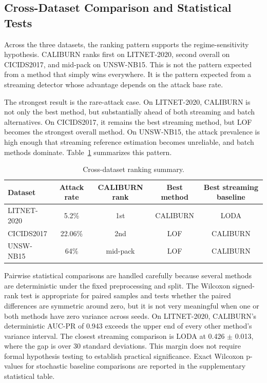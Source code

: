 \documentclass[preprint,12pt,authoryear]{elsarticle}
\newcommand{\caliburn}{CALIBURN}
\begin{document}
\subsection{Cross-Dataset Comparison and Statistical Tests}
\label{sec:results-cross}

Across the three datasets, the ranking pattern supports the regime-sensitivity hypothesis. \caliburn{} ranks first on LITNET-2020, second overall on CICIDS2017, and mid-pack on UNSW-NB15. This is not the pattern expected from a method that simply wins everywhere. It is the pattern expected from a streaming detector whose advantage depends on the attack base rate.

The strongest result is the rare-attack case. On LITNET-2020, \caliburn{} is not only the best method, but substantially ahead of both streaming and batch alternatives. On CICIDS2017, it remains the best streaming method, but LOF becomes the strongest overall method. On UNSW-NB15, the attack prevalence is high enough that streaming reference estimation becomes unreliable, and batch methods dominate. Table~\ref{tab:cross-summary} summarizes this pattern.

\begin{table}[ht]
\centering
\caption{Cross-dataset ranking summary.}
\label{tab:cross-summary}
\begin{tabular}{lcccc}
\toprule
Dataset       & Attack rate & \caliburn{} rank & Best method & Best streaming baseline \\
\midrule
LITNET-2020   & 5.2\%       & 1st              & \caliburn{} & LODA \\
CICIDS2017    & 22.06\%     & 2nd              & LOF         & \caliburn{} \\
UNSW-NB15     & 64\%        & mid-pack         & LOF         & \caliburn{} \\
\bottomrule
\end{tabular}
\end{table}

Pairwise statistical comparisons are handled carefully because several methods are deterministic under the fixed preprocessing and split. The Wilcoxon signed-rank test \citep{wilcoxon1945individual} is appropriate for paired samples and tests whether the paired differences are symmetric around zero, but it is not very meaningful when one or both methods have zero variance across seeds. On LITNET-2020, \caliburn{}'s deterministic AUC-PR of 0.943 exceeds the upper end of every other method's variance interval. The closest streaming comparison is LODA at 0.426 $\pm$ 0.013, where the gap is over 30 standard deviations. This margin does not require formal hypothesis testing to establish practical significance. Exact Wilcoxon p-values for stochastic baseline comparisons are reported in the supplementary statistical table.
\end{document}
